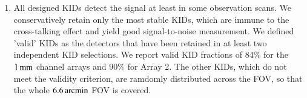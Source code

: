 \documentclass[traditionalabstract]{aa}
\begin{document}
\begin{enumerate}
\item %
  All designed KIDs detect the
  signal at least in some observation
  scans. We conservatively retain only the most stable KIDs, which are
  immune to the cross-talking effect and yield good signal-to-noise
  measurement. We defined 'valid' KIDs as the detectors that have been
  retained in at least two independent KID selections.
  We report valid KID fractions of $84\%$
  for the $1\,\rm{mm}$ channel arrays and $90\%$ for Array 2. The other
  KIDs, which do not meet the validity criterion, are ramdomly
  distributed across the FOV, so that the whole $6.6\,\rm{arcmin}$ FOV is
  covered.
  

\end{enumerate}
\end{document}
